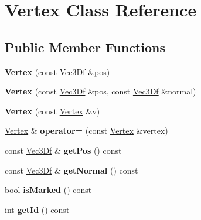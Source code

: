 \hypertarget{class_vertex}{
\section{Vertex Class Reference}
\label{class_vertex}
}
\subsection*{Public Member Functions}
\begin{DoxyCompactItemize}
\item 
\hypertarget{class_vertex_af7a13faf027010bf791afeab4b7e5334}{
{\bfseries Vertex} (const \hyperlink{class_vec3_d}{Vec3Df} \&pos)}
\label{class_vertex_af7a13faf027010bf791afeab4b7e5334}

\item 
\hypertarget{class_vertex_a27a83fd914a9c3356e1a91175af9dcb2}{
{\bfseries Vertex} (const \hyperlink{class_vec3_d}{Vec3Df} \&pos, const \hyperlink{class_vec3_d}{Vec3Df} \&normal)}
\label{class_vertex_a27a83fd914a9c3356e1a91175af9dcb2}

\item 
\hypertarget{class_vertex_a2cd575cac73be8dba0f87dfc38fe20e7}{
{\bfseries Vertex} (const \hyperlink{class_vertex}{Vertex} \&v)}
\label{class_vertex_a2cd575cac73be8dba0f87dfc38fe20e7}

\item 
\hypertarget{class_vertex_a0a25587d8b6e15e799bd4384a9f443cf}{
\hyperlink{class_vertex}{Vertex} \& {\bfseries operator=} (const \hyperlink{class_vertex}{Vertex} \&vertex)}
\label{class_vertex_a0a25587d8b6e15e799bd4384a9f443cf}

\item 
\hypertarget{class_vertex_abc85a4fa1297c23dbb5bd99c3b410943}{
const \hyperlink{class_vec3_d}{Vec3Df} \& {\bfseries getPos} () const }
\label{class_vertex_abc85a4fa1297c23dbb5bd99c3b410943}

\item 
\hypertarget{class_vertex_ad35a48e6284848d838dc57fe8876beea}{
const \hyperlink{class_vec3_d}{Vec3Df} \& {\bfseries getNormal} () const }
\label{class_vertex_ad35a48e6284848d838dc57fe8876beea}

\item 
\hypertarget{class_vertex_afa6b3258a4e1702a9335c1bd65dc1f39}{
bool {\bfseries isMarked} () const }
\label{class_vertex_afa6b3258a4e1702a9335c1bd65dc1f39}

\item 
\hypertarget{class_vertex_aa61ee83bfe1b0c80f0b554663bdbd2da}{
int {\bfseries getId} () const }
\label{class_vertex_aa61ee83bfe1b0c80f0b554663bdbd2da}


\end{DoxyCompactItemize}
